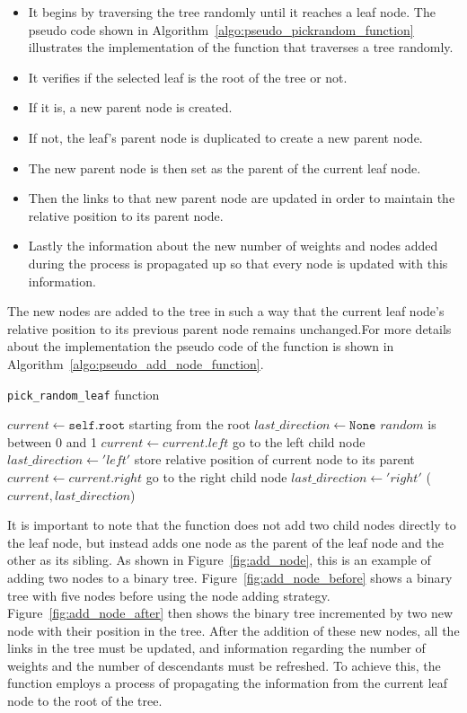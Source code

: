 \begin{itemize}
\item It begins by traversing the tree randomly until it reaches a leaf node. The pseudo code shown in Algorithm~\ref{algo:pseudo_pickrandom_function} illustrates the implementation of the function that traverses a tree randomly.
\item It verifies if the selected leaf is the root of the tree or not.
\item If it is, a new parent node is created.
\item If not, the leaf's parent node is duplicated to create a new parent node.
\item The new parent node is then set as the parent of the current leaf node.
\item Then the links to that new parent node are updated in order to maintain the relative position to its parent node.
\item Lastly the information about the new number of weights and nodes added during the process is propagated up so that every node is updated with this information.
\end{itemize}

The new nodes are added to the tree in such a way that the current leaf node's relative position to its previous parent node remains unchanged.For more details about the implementation the pseudo code of the function is shown in Algorithm~\ref{algo:pseudo_add_node_function}.

\begin{algorithm}[!ht]
\caption{\texttt{pick\_random\_leaf} function}
\label{algo:pseudo_pickrandom_function}
\begin{algorithmic}
\State $current \gets \texttt{self.root}$ \Comment starting from the root 
\State $last\_direction \gets \texttt{None}$ 
 \Comment $random$ is between 0 and 1
\State $current \gets current.left$ \Comment go to the left child node
\State $last\_direction \gets 'left'$ \Comment store relative position of current node to its parent
\Else 
\State $current \gets current.right$ \Comment go to the right child node
\State $last\_direction \gets 'right'$ 
\EndIf
\EndWhile
\Return ($current, last\_direction$)
\EndFunction
\end{algorithmic}
\end{algorithm}

It is important to note that the function does not add two child nodes directly to the leaf node, but instead adds one node as the parent of the leaf node and the other as its sibling. As shown in Figure~\ref{fig:add_node}, this is an example of adding two nodes to a binary tree. Figure~\ref{fig:add_node_before} shows a binary tree with five nodes before using the node adding strategy. Figure~\ref{fig:add_node_after} then shows the binary tree incremented by two new node with their position in the tree. After the addition of these new nodes, all the links in the tree must be updated, and information regarding the number of weights and the number of descendants must be refreshed. To achieve this, the function employs a process of propagating the information from the current leaf node to the root of the tree.

